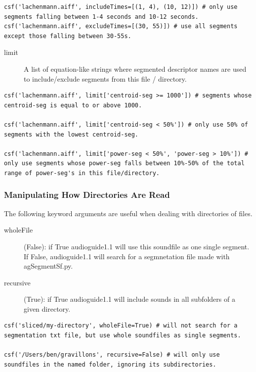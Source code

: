 \documentclass{article}
\newcommand{\ag}{audioguide1.1 }
\begin{document}
\begin{spacing}{1.2}
\begin{lstlisting}
csf('lachenmann.aiff', includeTimes=[(1, 4), (10, 12)]) # only use segments falling between 1-4 seconds and 10-12 seconds.
csf('lachenmann.aiff', excludeTimes=[(30, 55)]) # use all segments except those falling between 30-55s.
\end{lstlisting}

\begin{description}
\item[limit] A list of equation-like strings where segmented descriptor names are used to include/exclude segments from this file / directory.
\end{description}
\begin{lstlisting}
csf('lachenmann.aiff', limit['centroid-seg >= 1000']) # segments whose centroid-seg is equal to or above 1000.

csf('lachenmann.aiff', limit['centroid-seg < 50%']) # only use 50% of segments with the lowest centroid-seg.

csf('lachenmann.aiff', limit['power-seg < 50%', 'power-seg > 10%']) # only use segments whose power-seg falls between 10%-50% of the total range of power-seg's in this file/directory.
\end{lstlisting}



\subsubsection{Manipulating How Directories Are Read}
The following keyword arguments are useful when dealing with directories of files.
\begin{description}
\item[wholeFile] (False): if True \ag will use this soundfile as one single segment.  If False, \ag will search for a segmnetation file made with agSegmentSf.py.

\item[recursive] (True): if True \ag will include sounds in all subfolders of a given directory.
\end{description}

\begin{lstlisting}
csf('sliced/my-directory', wholeFile=True) # will not search for a segmentation txt file, but use whole soundfiles as single segments.

csf('/Users/ben/gravillons', recursive=False) # will only use soundfiles in the named folder, ignoring its subdirectories.
\end{lstlisting}


\end{spacing}
\end{document}
